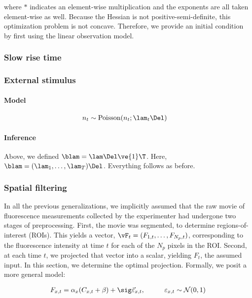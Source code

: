 \noindent where $\ast$ indicates an element-wise multiplication and the exponents are all taken element-wise as well. Because the Hessian is not positive-semi-definite, this optimization problem is not concave.  Therefore, we provide an initial condition by first using the linear observation model.  

\subsubsection{Slow rise time}

\subsubsection{External stimulus}

\paragraph{Model}


\begin{align}
	n_t &\sim \text{Poisson}(n_t; \lam_t \Del)
\end{align}

\paragraph{Inference}

Above, we defined $\blam=\lam\Del\ve{1}\T$.  Here, $\blam=(\lam_1, \ldots, \lam_T) \Del$.  Everything follows as before.


\subsubsection{Spatial filtering}

In all the previous generalizations, we implicitly assumed that the raw movie of fluorescence measurements collected by the experimenter had undergone two stages of preprocessing.  First, the movie was segmented, to determine regions-of-interest (ROIs).  This yields a vector, $\vF_t=(F_{1,t}, \ldots, F_{N_p,t})$, corresponding to the fluorescence intensity at time $t$ for each of the $N_p$ pixels in the ROI.  Second, at each time $t$, we projected that vector into a scalar, yielding $F_t$, the assumed input.  In this section, we determine the optimal projection.  Formally, we posit a more general model:

\begin{align} \label{eq:bF}
F_{x,t} &= \alpha_x (C_{x,t} + \beta) +  \sig \vec{\varepsilon}_{x,t}, \qquad &\varepsilon_{x,t} \sim \mathcal{N}(0,1)   
\end{align}

